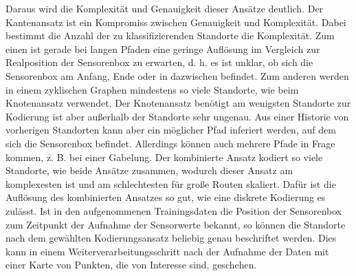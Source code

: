 \newline
\newline
Daraus wird die Komplexität und Genauigkeit dieser Ansätze deutlich.
Der Kantenansatz ist ein Kompromiss zwischen Genauigkeit und Komplexität.
Dabei bestimmt die Anzahl der zu klassifizierenden Standorte die Komplexität.
Zum einen ist gerade bei langen Pfaden eine geringe Auflösung im Vergleich zur Realposition der Sensorenbox zu erwarten,
d. h. es ist unklar, ob sich die Sensorenbox am Anfang, Ende oder in dazwischen befindet.
Zum anderen werden in einem zyklischen Graphen mindestens so viele Standorte, wie beim Knotenansatz verwendet.
Der Knotenansatz benötigt am wenigsten Standorte zur Kodierung ist aber außerhalb der Standorte sehr ungenau.
\newpage
Aus einer Historie von vorherigen Standorten kann aber ein möglicher Pfad inferiert werden, auf dem sich die Sensorenbox befindet.
Allerdings können auch mehrere Pfade in Frage kommen, z. B. bei einer Gabelung.
Der kombinierte Ansatz kodiert so viele Standorte, wie beide Ansätze zusammen,
wodurch dieser Ansatz am komplexesten ist und am schlechtesten für große Routen skaliert.
Dafür ist die Auflösung des kombinierten Ansatzes so gut, wie eine diskrete Kodierung es zulässt.
\newline
\newline
Ist in den aufgenommenen Trainingsdaten die Position der Sensorenbox zum Zeitpunkt der Aufnahme der Sensorwerte bekannt,
so können die Standorte nach dem gewählten Kodierungsansatz beliebig genau beschriftet werden.
Dies kann in einem Weiterverarbeitungsschritt nach der Aufnahme der Daten mit einer Karte von Punkten, die von Interesse sind, geschehen.